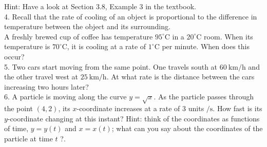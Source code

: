 \documentclass[10pt]{article}
\begin{document}
Hint: Have a look at Section 3.8, Example 3 in the textbook.\\
4. Recall that the rate of cooling of an object is proportional to the difference in temperature between the object and its surrounding.\\
A freshly brewed cup of coffee has temperature $95^{\circ} \mathrm{C}$ in a $20^{\circ} \mathrm{C}$ room. When its temperature is $70^{\circ} \mathrm{C}$, it is cooling at a rate of $1^{\circ} \mathrm{C}$ per minute. When does this occur?\\
5. Two cars start moving from the same point. One travels south at $60 \mathrm{~km} / \mathrm{h}$ and the other travel west at $25 \mathrm{~km} / \mathrm{h}$. At what rate is the distance between the cars increasing two hours later?\\
6. A particle is moving along the curve $y=\sqrt{x}$. As the particle passes through the point $(4,2)$, its $x$-coordinate increases at a rate of 3 units $/ \mathrm{s}$. How fast is its $y$-coordinate changing at this instant? Hint: think of the coordinates as functions of time, $y=y(t)$ and $x=x(t)$; what can you say about the coordinates of the particle at time $t$ ?.
\end{document}
